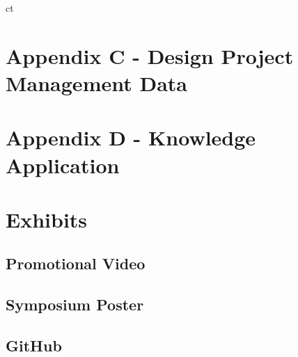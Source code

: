 ct\documentclass[a4paper,11pt]{article}
\begin{document}
\newpage
\section{Appendix C - Design Project Management Data}


\section{Appendix D - Knowledge Application}

\section{Exhibits}
\subsection{Promotional Video}
\subsection{Symposium Poster}
\subsection{GitHub}
\end{document}
